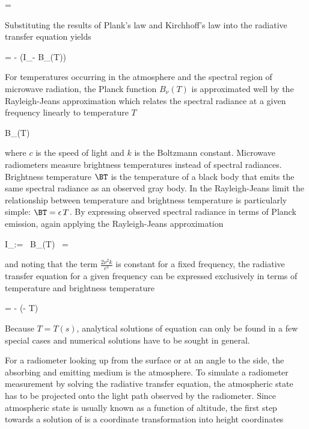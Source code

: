      \le \ABSCOEF = \epsilon {} \EQSTOP
    \stopformula

    Substituting the results of Plank's law and Kirchhoff's law into the
    radiative transfer equation  yields

    \startformula
         = - \ABSCOEF(I_\nu - B_\nu(T)) \EQSTOP
    \stopformula

    For temperatures occurring in the atmosphere and the spectral region of
    microwave radiation, the Planck function $B_\nu (T)$ is approximated
    well by the Rayleigh-Jeans approximation which relates the spectral
    radiance at a given frequency linearly to temperature $T$

    \startformula
        B_\nu(T) \approx {} \EQCOMMA
    \stopformula

    where $c$ is the speed of light and $k$ is the Boltzmann constant.
    Microwave radiometers measure brightness temperatures instead of spectral
    radiances. Brightness temperature $\BT$ is the temperature of a black body
    that emits the same spectral radiance as an observed gray body. In the
    Rayleigh-Jeans limit the relationship between temperature and brightness
    temperature is particularly simple: $\BT = \epsilon \, T$. By expressing
    observed spectral radiance in terms of Planck emission, again
    applying the Rayleigh-Jeans approximation

    \startformula
        I_\nu := \epsilon \, B_\nu(T)
            \approx \epsilon \, 
            =  \, \BT \EQCOMMA
    \stopformula

    and noting that the term $\frac{2 \nu^2 k}{c^2}$ is constant for a
    fixed frequency, the radiative transfer equation  for
    a given frequency can be expressed exclusively in terms of temperature and
    brightness temperature

    \startformula
         = - \ABSCOEF (\BT - T) \EQSTOP
    \stopformula

    Because $T = T(s)$, analytical solutions of equation 
    can only be found in a few special cases and numerical solutions have to
    be sought in general.

\stopsection


\startsection[title={A Solution for Ground-based Radiometer Applications}]

    For a radiometer looking up from the surface or at an angle to the side, the
    absorbing and emitting medium is the atmosphere. To simulate a radiometer
    measurement by solving the radiative transfer equation, the atmospheric
    state has to be projected onto the light path observed by the radiometer.
    Since atmospheric state is usually known as a function of altitude, the
    first step towards a solution of  is a coordinate
    transformation into height coordinates

